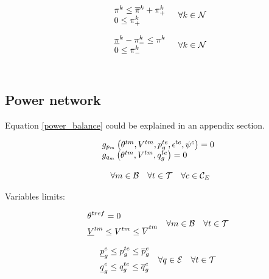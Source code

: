 \begin{equation}
\begin{array}{l}
 \pi^{k} \le \overline{\pi}^{k} + \pi^{k}_{+}\\
 0 \le \pi^{k}_{+}\\
\end{array} 
\quad \forall k  \in {\cal{N}}\\ 
\label{overp}
\end{equation}

\begin{equation}
\begin{array}{l}
\underline{\pi}^{k} - \pi^{k}_{-} \le \pi^{k}\\
0 \le \pi^{k}_{-}\\
\end{array} 
\quad \forall k  \in {\cal{N}}\\ 
\label{underp}
\end{equation}
\\

\subsection{Power network}

Equation \ref{power_balance} could be explained in an appendix section.
 
\begin{equation}
\begin{array}{l}
g_{p_m}\left(\theta^{tm}, V^{tm}, p_{g}^{te}, \epsilon^{te}, \psi^{c}\right) = 0\\
g_{q_m}\left(\theta^{tm}, V^{tm}, q_{g}^{te}\right) = 0\\
\\
\quad \forall m \in {\cal{B}} \quad \forall t  \in {\cal{T}} \quad \forall c  \in {\cal{C}}_{E}  
\end{array}
\label{power_balance}
\end{equation}

Variables limits:

\begin{equation}
\begin{aligned}
&\theta^{tref} = 0\\
&\underline{V}^{tm} \le V^{tm}  \le \overline{V}^{tm}\\
\end{aligned} 
\quad \forall m \in {\cal{B}} \quad \forall t  \in {\cal{T}}  
\label{ang_lims}
\end{equation}

\begin{equation}
\begin{aligned}
&\underline{p}_{g}^{e} \le p_{g}^{te}  \le \overline{p}_{g}^{e}\\
&\underline{q}_{g}^{e} \le q_{g}^{te}  \le \overline{q}_{g}^{e}\\
\end{aligned} 
\quad \forall q \in {\cal{E}} \quad \forall t  \in {\cal{T}}  
\label{power_lims}
\end{equation}

